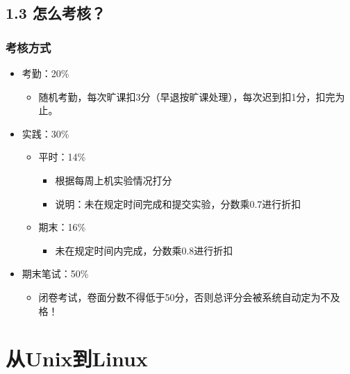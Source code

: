 \documentclass[xcolor=svgnames,bigger,presentation]{beamer}
\begin{document}
\subsection{1.3 怎么考核？}
\label{sec-1-3}
\begin{frame}
\frametitle{考核方式}
\label{sec-1-3-1}
\begin{itemize}

\item 考勤：20\%
\label{sec-1-3-1-1}%
\begin{itemize}

\item 随机考勤，每次旷课扣3分（早退按旷课处理），每次迟到扣1分，扣完为止。
\label{sec-1-3-1-1-1}%
\end{itemize} %

\item 实践：30\%
\label{sec-1-3-1-2}%
\begin{itemize}

\item 平时：14\%
\label{sec-1-3-1-2-1}%
\begin{itemize}

\item 根据每周上机实验情况打分
\label{sec-1-3-1-2-1-1}%

\item 说明：未在规定时间完成和提交实验，分数乘0.7进行折扣
\label{sec-1-3-1-2-1-2}%
\end{itemize} %

\item 期末：16\%
\label{sec-1-3-1-2-2}%
\begin{itemize}

\item 未在规定时间内完成，分数乘0.8进行折扣
\label{sec-1-3-1-2-2-1}%
\end{itemize} %
\end{itemize} %

\item 期末笔试：50\%
\label{sec-1-3-1-3}%
\begin{itemize}

\item 闭卷考试，卷面分数不得低于50分，否则总评分会被系统自动定为不及格！
\label{sec-1-3-1-3-1}%
\end{itemize} %
\end{itemize} %
\end{frame}
\section{从Unix到Linux}
\label{sec-2}
\end{document}

